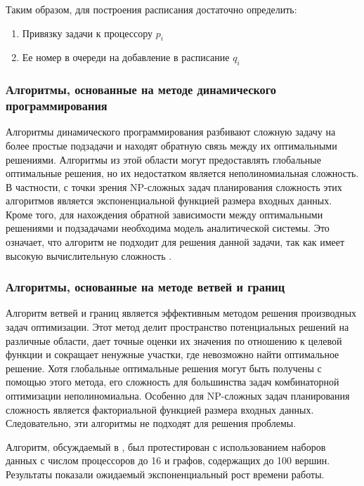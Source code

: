 Таким образом, для построения расписания достаточно определить:
\begin{enumerate}
    \item Привязку задачи к процессору $p_i$
    \item Ее номер в очереди на добавление в расписание $q_i$
\end{enumerate}

\subsubsection{Алгоритмы, основанные на методе динамического программирования}

Алгоритмы динамического программирования разбивают сложную задачу на более простые подзадачи и находят обратную связь между их оптимальными решениями. Алгоритмы из этой области могут предоставлять глобальные оптимальные решения, но их недостатком является неполиномиальная сложность. В частности, с точки зрения NP-сложных задач планирования сложность этих алгоритмов является экспоненциальной функцией размера входных данных. Кроме того, для нахождения обратной зависимости между оптимальными решениями и подзадачами необходима модель аналитической системы. Это означает, что алгоритм не подходит для решения данной задачи, так как имеет высокую вычислительную сложность \cite{Dynamic_prog}.

\subsubsection{Алгоритмы, основанные на методе ветвей и границ}

Алгоритм ветвей и границ является эффективным методом решения производных задач оптимизации. Этот метод делит пространство потенциальных решений на различные области, дает точные оценки их значения по отношению к целевой функции и сокращает ненужные участки, где невозможно найти оптимальное решение. Хотя глобальные оптимальные решения могут быть получены с помощью этого метода, его сложность для большинства задач комбинаторной оптимизации неполиномиальна. Особенно для NP-сложных задач планирования сложность является факториальной функцией размера входных данных. Следовательно, эти алгоритмы не подходят для решения проблемы.

Алгоритм, обсуждаемый в \cite{Rahman2009BranchAB}, был протестирован с использованием наборов данных с числом процессоров до 16 и графов, содержащих до 100 вершин. Результаты показали ожидаемый экспоненциальный рост времени работы.

